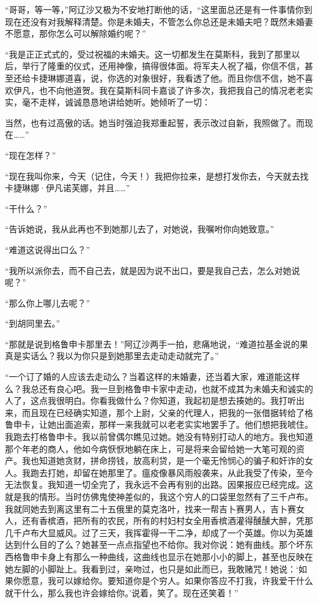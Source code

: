 \par “哥哥，等一等，”阿辽沙又极为不安地打断他的话，“这里面总还是有一件事情你到现在还没有对我解释清楚。你是未婚夫，不管怎么你总还是未婚夫吧？既然未婚妻不愿意，那你怎么可以解除婚约呢？”
\par “我是正正式式的，受过祝福的未婚夫。这一切都发生在莫斯科，我到了那里以后，举行了隆重的仪式，还用神像，搞得很体面。将军夫人祝了福，你信不信，甚至还给卡捷琳娜道喜，说，你选的对象很好，我看透了他。而且你信不信，她不喜欢伊凡，也不向他道贺。我在莫斯科同卡嘉谈了许多次，我把我自己的情况老老实实，毫不走样，诚诚恳恳地讲给她听。她倾听了一切：
\par 当然，也有过高傲的话。她当时强迫我郑重起誓，表示改过自新，我照做了。而现在……”
\par “现在怎样？”
\par “现在我叫你来，今天（记住，今天！）我把你拉来，是想打发你去，今天就去找卡捷琳娜·伊凡诺芙娜，并且……”
\par “干什么？”
\par “告诉她说，我从此再也不到她那儿去了，对她说，我嘱咐你向她致意。”
\par “难道这说得出口么？”
\par “我所以派你去，而不自己去，就是因为说不出口，要是我自己去，怎么对她说呢？”
\par “那么你上哪儿去呢？”
\par “到胡同里去。”
\par “那就是说到格鲁申卡那里去！”阿辽沙两手一拍，悲痛地说，“难道拉基金说的果真是实话么？我以为你只是到她那里去走动走动就完了。”
\par “一个订了婚的人应该去走动么？当着这样的未婚妻，还当着大家，难道能这样么？我总还有良心吧。我一旦到格鲁申卡家中走动，也就不成其为未婚夫和诚实的人了，这点我很明白。你看我做什么？你知道，我起初是想去揍她的。我打听出来，而且现在已经确实知道，那个上尉，父亲的代理人，把我的一张借据转给了格鲁申卡，让她出面追索，那样一来我就可以老老实实地罢手了。他们想把我唬住。我跑去打格鲁申卡。我以前曾偶尔瞧见过她。她没有特别打动人的地方。我也知道那个年老的商人，他如今病恹恹地躺在床上，可是将来会留给她一大笔可观的资产。我也知道她贪财，拼命捞钱，放高利贷，是一个毫无怜悯心的骗子和奸诈的女人。我跑去打她，却留在她那里了。瘟疫像暴风雨般袭来，从此我受了传染，至今无法恢复。我知道一切全完了，我永远不会再有别的出路。因果报应已经完成。这就是我的情形。当时仿佛鬼使神差似的，我这个穷人的口袋里忽然有了三千卢布。我就同她去到离这里有二十五俄里的莫克洛叶，找来一帮吉卜赛男人，吉卜赛女人，还有香槟酒，把所有的农民，所有的村妇村女全用香槟酒灌得醺醺大醉，凭那几千卢布大显威风。过了三天，我挥霍得一干二净，却成了一个英雄。你以为英雄达到什么目的了么？她甚至一点点指望也不给你。我对你说：她有曲线。那个坏东西格鲁申卡身上有那么一种曲线，这曲线也显示在她那小小的脚上，甚至也反映在她左脚的小脚趾上。我看到过，亲吻过，也只是如此而已，我敢赌咒！她说：‘如果你愿意，我可以嫁给你。要知道你是个穷人。如果你答应不打我，许我爱干什么就干什么，那么我也许会嫁给你。’说着，笑了。现在还笑着！”
